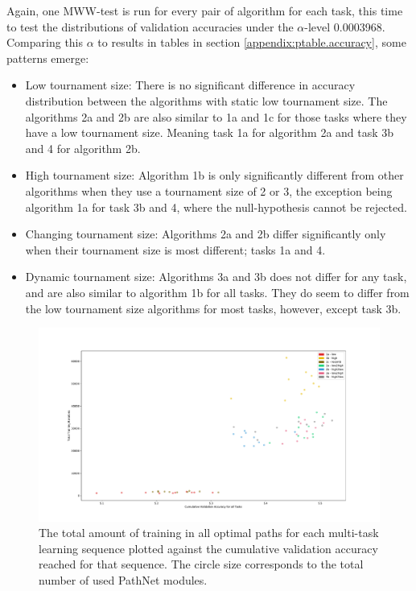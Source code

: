 Again, one MWW-test is run for every pair of algorithm for each task, this time to test the distributions of validation accuracies under the \(\alpha\)-level 0.0003968. Comparing this \(\alpha\) to results in tables in section \ref{appendix:ptable.accuracy}, some patterns emerge: 
\begin{itemize}
    \item Low tournament size: There is no significant difference in accuracy distribution between the algorithms with static low tournament size. The algorithms 2a and 2b are also similar to 1a and 1c for those tasks where they have a low tournament size. Meaning task 1a for algorithm 2a and task 3b and 4 for algorithm 2b. 
    \item High tournament size: Algorithm 1b is only significantly different from other algorithms when they use a tournament size of 2 or 3, the exception being algorithm 1a for task 3b and 4, where the null-hypothesis cannot be rejected. 
    \item Changing tournament size: Algorithms 2a and 2b differ significantly only when their tournament size is most different; tasks 1a and 4. 
    \item Dynamic tournament size: Algorithms 3a and 3b does not differ for any task, and are also similar to algorithm 1b for all tasks. They do seem to differ from the low tournament size algorithms for most tasks, however, except task 3b. 
\end{itemize}

\begin{figure}
    \includegraphics[width=1.2\textwidth,center]{Chapters/4.Experiments/exp2/figures/large/Training_value.pdf}
    \caption[Training vs cumulative accuracy plot]{The total amount of training in all optimal paths for each multi-task learning sequence plotted against the cumulative validation accuracy reached for that sequence. The circle size corresponds to the total number of used PathNet modules.}
    \label{fig:search.training_value}
\end{figure}

